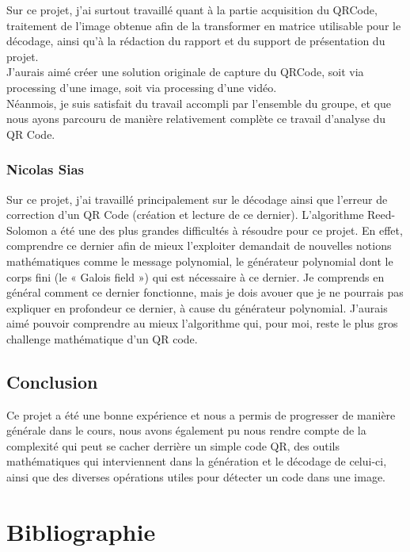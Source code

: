 \documentclass{report}
\begin{document}
			Sur ce projet, j'ai surtout travaillé quant à la partie acquisition du QRCode, traitement de l'image obtenue afin de la transformer en matrice utilisable pour le décodage, ainsi qu'à la rédaction du rapport et du support de présentation du projet.\\

			J'aurais aimé créer une solution originale de capture du QRCode, soit via processing d'une image, soit via processing d'une vidéo.\\
			Néanmois, je suis satisfait du travail accompli par l'ensemble du groupe, et que nous ayons parcouru de manière relativement complète ce travail d'analyse du QR Code.\\

		\subsection{Nicolas Sias}
		
		    Sur ce projet, j’ai travaillé principalement sur le décodage ainsi que l’erreur de correction d’un QR Code (création et lecture de ce dernier). L’algorithme Reed-Solomon a été une des plus grandes difficultés à résoudre pour ce projet. En effet, comprendre ce dernier afin de mieux l’exploiter demandait de nouvelles notions mathématiques comme le message polynomial, le générateur polynomial dont le corps fini (le « Galois field ») qui est nécessaire à ce dernier. Je comprends en général comment ce dernier fonctionne, mais je dois avouer que je ne pourrais pas expliquer en profondeur ce dernier, à cause du générateur polynomial. J’aurais aimé pouvoir comprendre au mieux l’algorithme qui, pour moi, reste le plus gros challenge mathématique d’un QR code.

	\section{Conclusion}

	Ce projet a été une bonne expérience et nous a permis de progresser de manière générale dans le cours, nous avons également pu nous rendre compte de la complexité qui peut se cacher derrière un simple code QR, des outils mathématiques qui interviennent dans la génération et le décodage de celui-ci, ainsi que des diverses opérations utiles pour détecter un code dans une image.\\

\chapter{Bibliographie}
\end{document}
